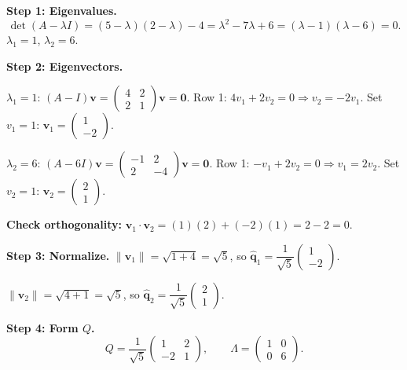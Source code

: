 \documentclass[12pt,a4paper]{article}
\begin{document}
\textbf{Step 1: Eigenvalues.}
\[
  \det(A-\lambda I) = (5-\lambda)(2-\lambda) - 4 = \lambda^2 - 7\lambda + 6 = (\lambda-1)(\lambda-6) = 0.
\]
$\lambda_1 = 1$, $\lambda_2 = 6$.

\textbf{Step 2: Eigenvectors.}

$\lambda_1 = 1$: $(A-I)\mathbf{v} = \begin{pmatrix}4&2\\2&1\end{pmatrix}\mathbf{v} = \mathbf{0}$. Row 1: $4v_1+2v_2=0 \Rightarrow v_2 = -2v_1$. Set $v_1=1$: $\mathbf{v}_1 = \begin{pmatrix}1\\-2\end{pmatrix}$.

$\lambda_2 = 6$: $(A-6I)\mathbf{v} = \begin{pmatrix}-1&2\\2&-4\end{pmatrix}\mathbf{v} = \mathbf{0}$. Row 1: $-v_1+2v_2=0 \Rightarrow v_1=2v_2$. Set $v_2=1$: $\mathbf{v}_2 = \begin{pmatrix}2\\1\end{pmatrix}$.

\textbf{Check orthogonality:} $\mathbf{v}_1 \cdot \mathbf{v}_2 = (1)(2)+(-2)(1) = 2-2 = 0$. \checkmark

\textbf{Step 3: Normalize.}
$\|\mathbf{v}_1\| = \sqrt{1+4} = \sqrt{5}$, so $\hat{\mathbf{q}}_1 = \dfrac{1}{\sqrt{5}}\begin{pmatrix}1\\-2\end{pmatrix}$.

$\|\mathbf{v}_2\| = \sqrt{4+1} = \sqrt{5}$, so $\hat{\mathbf{q}}_2 = \dfrac{1}{\sqrt{5}}\begin{pmatrix}2\\1\end{pmatrix}$.

\textbf{Step 4: Form $Q$.}
\[
  Q = \dfrac{1}{\sqrt{5}}\begin{pmatrix}1&2\\-2&1\end{pmatrix}, \qquad \Lambda = \begin{pmatrix}1&0\\0&6\end{pmatrix}.
\]
\end{document}
